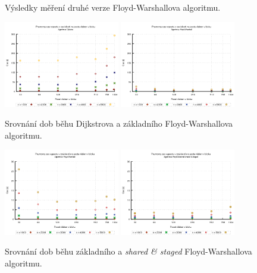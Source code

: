 \begin{figure}
    \centering
    \caption{Výsledky měření druhé verze Floyd-Warshallova algoritmu.}
    \label{f:cuda:vysledky:fw-v2}
\end{figure}


\begin{figure}
    \centering
    \includegraphics[width=0.45\textwidth]{../grafy/03_cuda/03-01-Dijkstra_cas}
    \includegraphics[width=0.45\textwidth]{../grafy/03_cuda/03-01-Floyd_v1_cas}
    \caption{Srovnání dob běhu Dijkstrova a základního Floyd-Warshallova algoritmu.}
    \label{f:mer:cuda:cas1}
\end{figure}

\begin{figure}
    \centering
    \includegraphics[width=0.45\textwidth]{../grafy/03_cuda/03-01-Floyd_v1_cas_zoom}
    \includegraphics[width=0.45\textwidth]{../grafy/03_cuda/03-01-Floyd_v2_cas}
    \caption{Srovnání dob běhu základního a \emph{shared \& staged} Floyd-Warshallova algoritmu.}
    \label{f:mer:cuda:cas2}
\end{figure}

